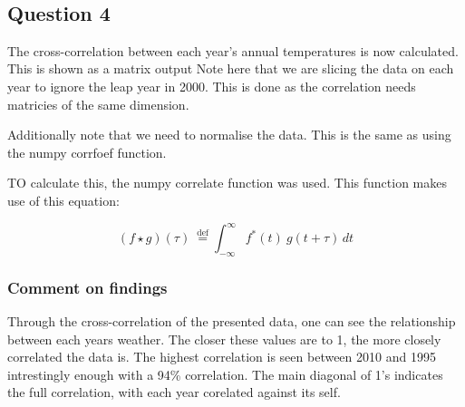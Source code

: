 \documentclass[11pt]{article}
\begin{document}
    \begin{center}
    \end{center}
    { \hspace*{\fill} \\}
    
    \subsection{Question 4}\label{question-4}

The cross-correlation between each year's annual temperatures is now
calculated. This is shown as a matrix output Note here that we are
slicing the data on each year to ignore the leap year in 2000. This is
done as the correlation needs matricies of the same dimension.

Additionally note that we need to normalise the data. This is the same
as using the numpy corrfoef function.

TO calculate this, the numpy correlate function was used. This function
makes use of this equation:

\[(f \star g)(\tau)\ \stackrel{\mathrm{def}}{=} \int_{-\infty}^{\infty} f^*(t)\ g(t+\tau)\,dt\]

\subsubsection{Comment on findings}\label{comment-on-findings}

Through the cross-correlation of the presented data, one can see the
relationship between each years weather. The closer these values are to
1, the more closely correlated the data is. The highest correlation is
seen between 2010 and 1995 intrestingly enough with a 94\% correlation.
The main diagonal of 1's indicates the full correlation, with each year
corelated against its self.
\end{document}
